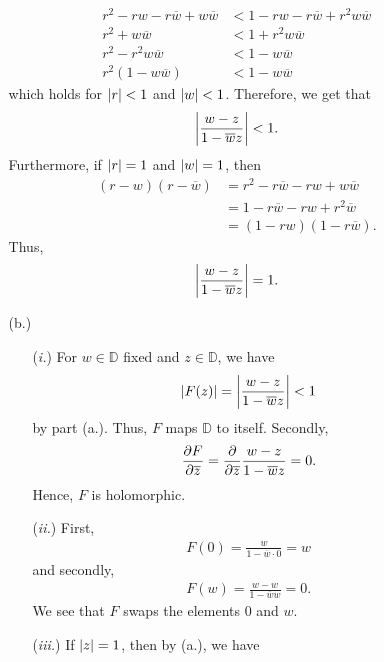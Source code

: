 \documentclass[a4paper,12pt]{article} %
\theoremstyle{plain}
\theoremstyle{definition}
\begin{document}
\begin{enumerate}
\begin{itemize}
\begin{align*}
           r^2 - rw -r\overline{w} + w \overline{w} &< 1 - rw -r \overline{w} + r^2 w \overline{w} \\
            r^2 + w \overline{w} &< 1 + r^2 w \overline{w} \\
            r^2 - r^2 w \overline{w} &< 1 - w \overline{w} \\
            r^2(1 - w \overline{w}) &< 1 - w \overline{w}
         \end{align*}
         which holds for $\abs{r} < 1$ and $\abs{w} < 1$.  Therefore, we get that
\begin{align*}
  \abs{\frac{w-z}{1 - \overline{w}z}} < 1.
\end{align*}
         Furthermore, if $\abs{r} = 1$ and $\abs{w} = 1$, then
         \begin{align*}
           (r-w)(r - \overline{w}) &= r^2 - r \overline{w} - rw + w \overline{w} \\
                                   &= 1 - r \overline{w} - rw + r^2 \overline{w} \\
                                   &= (1- rw)(1 - r\overline{w}).
         \end{align*}
Thus, 
\begin{align*}
  \abs{\frac{w-z}{1 - \overline{w} z}} = 1.
\end{align*}
\item[(b.)]  
  \begin{itemize}
    \item[(\textit{i.})]
      For $w \in \mathbb{D}$ fixed and $z \in \mathbb{D}$, we have
      \begin{align*}
        \abs{F(z)} = \abs{\frac{w-z}{1-\overline{w}z}} < 1
      \end{align*}
      by part (a.).  Thus, $F$ maps $\mathbb{D}$ to itself.  Secondly,
      \begin{align*}
        \pdv{F}{\overline{z}} = \pdv{\overline{z}} \frac{w-z}{1 - \overline{w}z} = 0.
      \end{align*}
     Hence, $F$ is holomorphic. 
    \item[(\textit{ii.})]  First,
      \begin{align*}
        F(0) = \frac{w}{1 - \overline{w}\cdot 0} = w
      \end{align*}
      and secondly,
      \begin{align*}
        F(w) = \frac{w-w}{1 - \overline{w}w} = 0.
      \end{align*}
      We see that $F$ swaps the elements $0$ and $w$.
    \item[(\textit{iii.})]  If $\abs{z} = 1$, then by (a.), we have

\end{itemize}
\end{itemize}
\end{enumerate}
\end{document}
